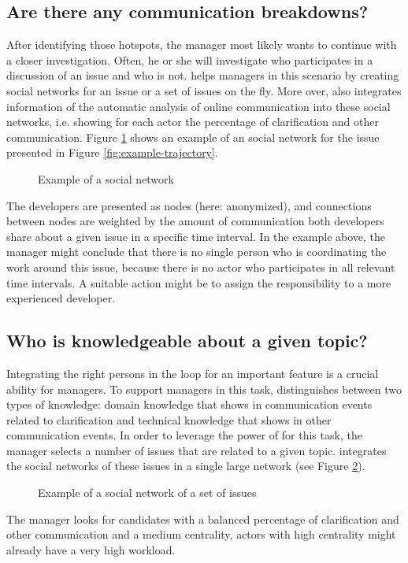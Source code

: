 \subsection{Are there any communication breakdowns?}
After identifying those hotspots, the manager most likely wants to continue with a closer investigation. 
Often, he or she will investigate who participates in a discussion of an issue and who is not.
\viss helps managers in this scenario by creating social networks for an issue or a set of issues on the fly.
More over, \viss also integrates information of the automatic analysis of online communication into these social networks, i.e. showing for each actor the percentage of clarification and other communication.
Figure \ref{fig:example-sn} shows an example of an social network for the issue presented in Figure \ref{fig:example-trajectory}. 
\begin{figure}
\label{fig:example-sn}
\caption{Example of a social network}
\end{figure}
The developers are presented as nodes (here: anonymized), and connections between nodes are weighted by the amount of communication both developers share about a given issue in a specific time interval. 
In the example above, the manager might conclude that there is no single person who is coordinating the work around this issue, because there is no actor who participates in all relevant time intervals.
A suitable action might be to assign the responsibility to a more experienced developer.

\subsection{Who is knowledgeable about a given topic?}

Integrating the right persons in the loop for an important feature is a crucial ability for managers.
To support managers in this task, \viss distinguishes between two types of knowledge: domain knowledge that shows in communication events related to clarification and technical knowledge that shows in other communication events.
In order to leverage the power of \viss for this task, the manager selects a number of issues that are related to a given topic. 
\viss integrates the social networks of these issues in a single large network (see Figure \ref{fig:example-sn-large}).
\begin{figure}
\label{fig:example-sn-large}
\caption{Example of a social network of a set of issues}
\end{figure}
The manager looks for candidates with a balanced percentage of clarification and other communication and a medium centrality, actors with high centrality might already have a very high workload.
